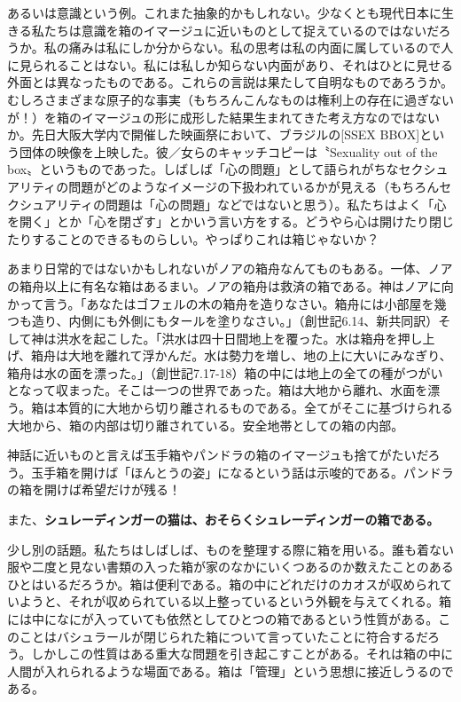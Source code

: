 \documentclass[b5j,twoside,twocolumn]{utarticle}
\begin{document}
あるいは意識という例。これまた抽象的かもしれない。少なくとも現代日本に生きる私たちは意識を箱のイマージュに近いものとして捉えているのではないだろうか。私の痛みは私にしか分からない。私の思考は私の内面に属しているので人に見られることはない。私には私しか知らない内面があり、それはひとに見せる外面とは異なったものである。これらの言説は果たして自明なものであろうか。むしろさまざまな原子的な事実（もちろんこんなものは権利上の存在に過ぎないが！）を箱のイマージュの形に成形した結果生まれてきた考え方なのではないか。先日大阪大学内で開催した映画祭において、ブラジルの[SSEX BBOX]という団体の映像を上映した。彼／女らのキャッチコピーは〝Sexuality out of the box〟というものであった。しばしば「心の問題」として語られがちなセクシュアリティの問題がどのようなイメージの下扱われているかが見える（もちろんセクシュアリティの問題は「心の問題」などではないと思う）。私たちはよく「心を開く」とか「心を閉ざす」とかいう言い方をする。どうやら心は開けたり閉じたりすることのできるものらしい。やっぱりこれは箱じゃないか？


あまり日常的ではないかもしれないがノアの箱舟なんてものもある。一体、ノアの箱舟以上に有名な箱はあるまい。ノアの箱舟は救済の箱である。神はノアに向かって言う。「あなたはゴフェルの木の箱舟を造りなさい。箱舟には小部屋を幾つも造り、内側にも外側にもタールを塗りなさい。」（創世記6.14、新共同訳）そして神は洪水を起こした。「洪水は四十日間地上を覆った。水は箱舟を押し上げ、箱舟は大地を離れて浮かんだ。水は勢力を増し、地の上に大いにみなぎり、箱舟は水の面を漂った。」（創世記7.17-18）箱の中には地上の全ての種がつがいとなって収まった。そこは一つの世界であった。箱は大地から離れ、水面を漂う。箱は本質的に大地から切り離されるものである。全てがそこに基づけられる大地から、箱の内部は切り離されている。安全地帯としての箱の内部。


神話に近いものと言えば玉手箱やパンドラの箱のイマージュも捨てがたいだろう。玉手箱を開けば「ほんとうの姿」になるという話は示唆的である。パンドラの箱を開けば希望だけが残る！


また、\textbf{シュレーディンガーの猫は、おそらくシュレーディンガーの箱である。}


少し別の話題。私たちはしばしば、ものを整理する際に箱を用いる。誰も着ない服や二度と見ない書類の入った箱が家のなかにいくつあるのか数えたことのあるひとはいるだろうか。箱は便利である。箱の中にどれだけのカオスが収められていようと、それが収められている以上整っているという外観を与えてくれる。箱には中になにが入っていても依然としてひとつの箱であるという性質がある。このことはバシュラールが閉じられた箱について言っていたことに符合するだろう。しかしこの性質はある重大な問題を引き起こすことがある。それは箱の中に人間が入れられるような場面である。箱は「管理」という思想に接近しうるのである。
\end{document}
